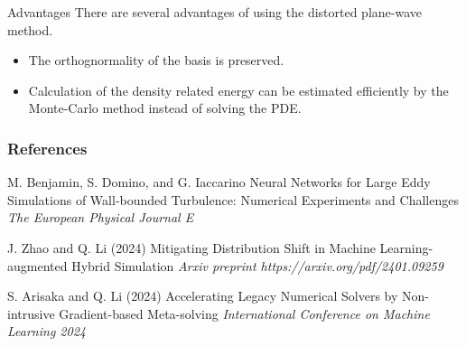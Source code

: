 \documentclass[paper slide]{beamer}
\begin{document}
\begin{frame}{Advantages}
	There are several advantages of using the distorted plane-wave method.
	\begin{itemize}
		\item The orthognormality of the basis is preserved.
		\item Calculation of the density related energy can be estimated 
		efficiently by the Monte-Carlo method instead of solving the PDE.
	\end{itemize}
\end{frame}

\begin{frame} %
    \frametitle{References}
 
    \begin{thebibliography}{99} %
        \footnotesize %
 
		M. Benjamin, S. Domino, and G. Iaccarino
		\newblock Neural Networks for Large Eddy Simulations of Wall-bounded Turbulence: Numerical Experiments and Challenges
		\newblock \emph{The European Physical Journal E}

        J. Zhao and Q. Li (2024)
        \newblock Mitigating Distribution Shift in Machine Learning-augmented Hybrid Simulation
        \newblock \emph{Arxiv preprint https://arxiv.org/pdf/2401.09259}

        S. Arisaka and Q. Li (2024)
        \newblock Accelerating Legacy Numerical Solvers by Non-intrusive Gradient-based Meta-solving
        \newblock \emph{International Conference on Machine Learning 2024}
 
        
    \end{thebibliography}
\end{frame}
\end{document}
